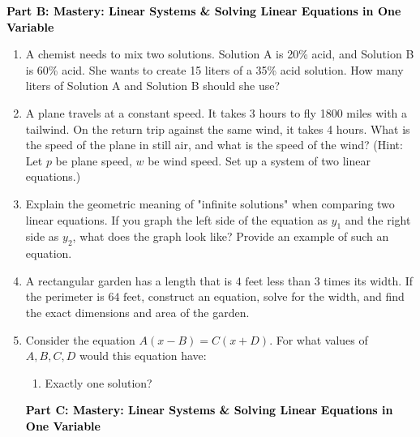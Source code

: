 \documentclass[12pt, letterpaper, fleqn]{article}
\begin{document}
\newpage

\begin{tcolorbox}[colback=customteal!20]
\large\textcolor{black}{\textbf{Part B: Mastery: Linear Systems \& Solving Linear Equations in One Variable}}
\end{tcolorbox}

\vspace{3mm}

\begin{enumerate}[itemsep=5.5cm, leftmargin=0.6cm, resume]
\item A chemist needs to mix two solutions. Solution A is 20\% acid, and Solution B is 60\% acid. She wants to create 15 liters of a 35\% acid solution. How many liters of Solution A and Solution B should she use?
\vspace{4cm}
\item A plane travels at a constant speed. It takes 3 hours to fly 1800 miles with a tailwind. On the return trip against the same wind, it takes 4 hours. What is the speed of the plane in still air, and what is the speed of the wind? (Hint: Let $p$ be plane speed, $w$ be wind speed. Set up a system of two linear equations.)
\vspace{4cm}
\item Explain the geometric meaning of "infinite solutions" when comparing two linear equations. If you graph the left side of the equation as $y_1$ and the right side as $y_2$, what does the graph look like? Provide an example of such an equation.
\vspace{4cm}
\item A rectangular garden has a length that is $4\text{ feet}$ less than 3 times its width. If the perimeter is $64\text{ feet}$, construct an equation, solve for the width, and find the exact dimensions and area of the garden.
\vspace{3cm}
\item Consider the equation $A(x-B) = C(x+D)$. For what values of $A, B, C, D$ would this equation have:
    \begin{enumerate}[label=(\alph*), itemsep=0.5cm]
\item Exactly one solution?
\end{enumerate}

\newpage

\begin{tcolorbox}[colback=customteal!20]
\large\textcolor{black}{\textbf{Part C: Mastery: Linear Systems \& Solving Linear Equations in One Variable}}
\end{tcolorbox}


\end{enumerate}
\end{document}
